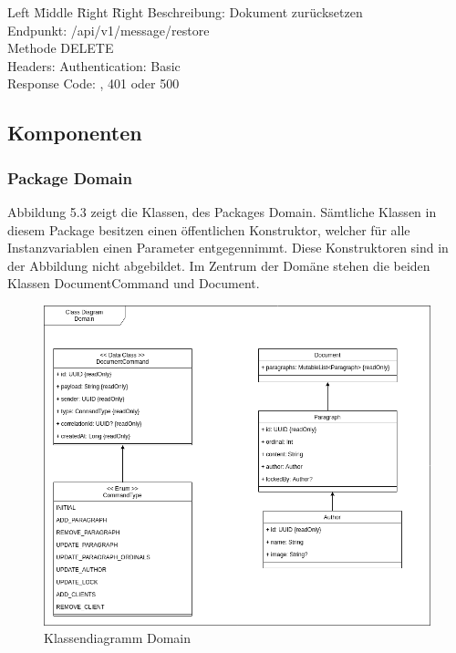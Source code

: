 \begin{tabbing}
    Left \= Middle \= Right \= Right \kill
    Beschreibung:  \> \> \> Dokument zurücksetzen \\
    Endpunkt:  \> \> \> /api/v1/message/restore\\
    Methode \>  \> \> DELETE\\
    Headers:  \> \>   \> Authentication: Basic\\
    Response Code:  \> \>  , 401 oder 500 \\
\end{tabbing}

\clearpage

\subsection{Komponenten}\label{subsec:komponenten}

\subsubsection{Package Domain}

Abbildung 5.3 zeigt die Klassen, des Packages Domain.
Sämtliche Klassen in diesem Package besitzen einen öffentlichen Konstruktor, welcher für alle Instanzvariablen einen Parameter entgegennimmt.
Diese Konstruktoren sind in der Abbildung nicht abgebildet.
Im Zentrum der Domäne stehen die beiden Klassen DocumentCommand und Document.

\begin{figure}[h]
    \centering
    \begin{minipage}[b]{0.8\textwidth}
        \includegraphics[width=\textwidth]{images/class-be-domain.drawio}
        \caption{Klassendiagramm Domain}
    \end{minipage}
\end{figure}

